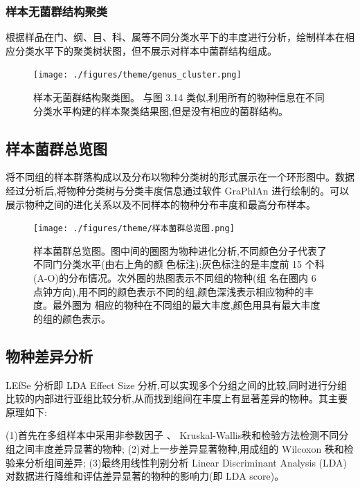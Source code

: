 \documentclass[a4paper,10pt]{article}
\numberwithin{figure}{section}
\numberwithin{table}{section}
\begin{document}
\subsubsection{样本无菌群结构聚类}
\label{Subsubsec:clusteringnobiota}
根据样品在门、纲、目、科、属等不同分类水平下的丰度进行分析，绘制样本在相应分类水平下的聚类树状图，但不展示对样本中菌群结构组成。

\begin{figure}[H]
\centering
\label{Fig:clusteringnobiota}
\captionsetup{width=.8\textwidth,singlelinecheck = false, justification=justified}
 \texttt{[image: ./figures/theme/genus\_cluster.png]}  
   \caption{样本无菌群结构聚类图。 与图 3.14 类似,利用所有的物种信息在不同分类水平构建的样本聚类结果图,但是没有相应的菌群结构。}
\end{figure}
\newpage
\subsection{样本菌群总览图}
\label{Subsec: allBioinSample}
将不同组的样本群落构成以及分布以物种分类树的形式展示在一个环形图中。数据经过分析后,将物种分类树与分类丰度信息通过软件 GraPhlAn \cite{Asnicar2015Compact} 进行绘制的。可以展示物种之间的进化关系以及不同样本的物种分布丰度和最高分布样本。
\begin{figure}[H]
\centering
\label{Fig:allBioinSample}
\captionsetup{width=.8\textwidth,singlelinecheck = false, justification=justified}
 \texttt{[image: ./figures/theme/样本菌群总览图.png]}  
   \caption{样本菌群总览图。图中间的圈图为物种进化分析,不同颜色分子代表了不同门分类水平(由右上角的颜
色标注);灰色标注的是丰度前 15 个科(A-O)的分布情况。次外圈的热图表示不同组的物种(组
名在圈内 6 点钟方向),用不同的颜色表示不同的组,颜色深浅表示相应物种的丰度。最外圈为
相应的物种在不同组的最大丰度,颜色用具有最大丰度的组的颜色表示。}
\end{figure}


\newpage
\subsection{物种差异分析}
\label{Subsec:speciesDiff}
LEfSe \cite{Paulson2013Differential} 分析即 LDA Effect Size 分析,可以实现多个分组之间的比较,同时进行分组比较的内部进行亚组比较分析,从而找到组间在丰度上有显著差异的物种。其主要原理如下:

(1)首先在多组样本中采用非参数因子 、 Kruskal-Wallis秩和检验方法检测不同分组之间丰度差异显著的物种; 
(2)对上一步差异显著物种,用成组的 Wilcoxon 秩和检验来分析组间差异;
(3)最终用线性判别分析 Linear Discriminant Analysis (LDA)对数据进行降维和评估差异显著的物种的影响力(即 LDA score)。
\end{document}

